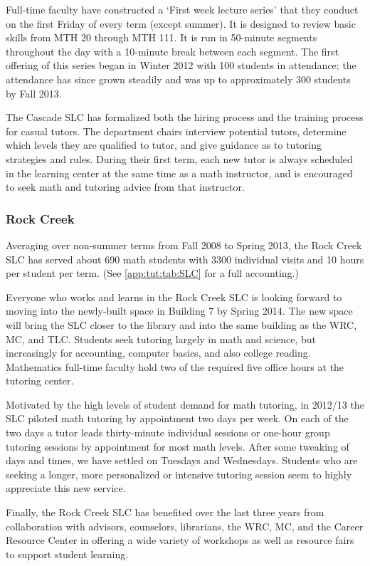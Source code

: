 Full-time faculty have constructed a `First week lecture series' that they
conduct on the first Friday of every term (except summer). It is designed to
review basic skills from MTH 20 through MTH 111. It is run in 50-minute
segments throughout the day with a 10-minute break between each segment. The
first offering of this series began in Winter 2012 with 100 students in
attendance; the attendance has since  grown steadily and  was up to
approximately 300 students by Fall 2013. 

The Cascade SLC has formalized both the hiring process and the training process
for casual tutors. The department chairs interview potential tutors, determine 
which levels they are qualified to tutor, and give guidance as to tutoring 
strategies and rules. During their first term, each new tutor is always scheduled in the learning center at the same time as a math instructor, and is encouraged to seek math 
and tutoring advice from that instructor.

\subsubsection{Rock Creek}
Averaging over non-summer terms from Fall 2008 to Spring 2013, the Rock Creek SLC has served about 
690 math students with 3300 individual visits and 10 hours per student per term. (See \vref{app:tut:tab:SLC} for a full accounting.) 

Everyone who works and learns in the Rock Creek SLC is looking forward to
moving into the newly-built space in Building 7 by Spring 2014. The new space
will bring the SLC closer to the library and into the same building as the WRC,
MC, and TLC.  Students seek tutoring largely in math and science, but
increasingly for accounting, computer basics, and also college reading.
Mathematics full-time faculty hold two of the required five office hours at the
tutoring center.

Motivated by the high levels of student demand for math tutoring, in 2012/13
the SLC piloted math tutoring by appointment two days per week. On each of the
two days a tutor leads thirty-minute individual sessions or one-hour group
tutoring sessions by appointment for most math levels.  After some tweaking of
days and times, we have settled on Tuesdays and Wednesdays.  Students who are
seeking a longer, more personalized or intensive tutoring session seem to
highly appreciate this new service.  

Finally, the Rock Creek SLC has benefited over the last three years from collaboration
with advisors, counselors, librarians, the WRC, MC, and the Career Resource
Center in offering a wide variety of workshops as well as resource fairs to
support student learning. 

